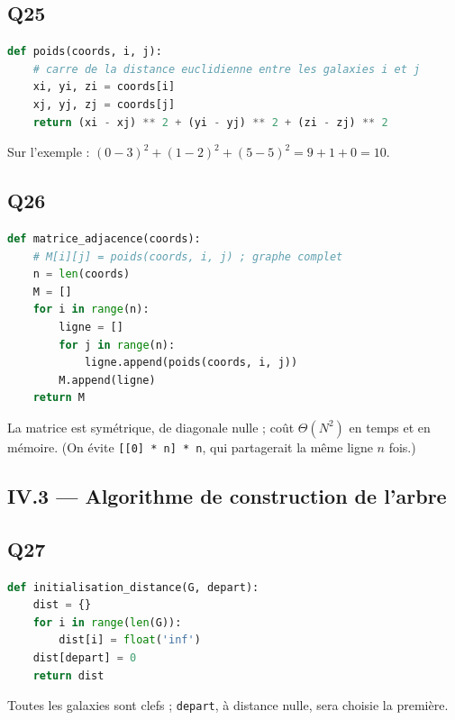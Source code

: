 \documentclass[11pt,a4paper]{article}
\begin{document}
\hypertarget{q25}{%
\subsection{Q25}\label{q25}}

\begin{lstlisting}[language=Python]
def poids(coords, i, j):
    # carre de la distance euclidienne entre les galaxies i et j
    xi, yi, zi = coords[i]
    xj, yj, zj = coords[j]
    return (xi - xj) ** 2 + (yi - yj) ** 2 + (zi - zj) ** 2
\end{lstlisting}

Sur l'exemple : \((0-3)^2 + (1-2)^2 + (5-5)^2 = 9 + 1 + 0 = 10\).

\hypertarget{q26}{%
\subsection{Q26}\label{q26}}

\begin{lstlisting}[language=Python]
def matrice_adjacence(coords):
    # M[i][j] = poids(coords, i, j) ; graphe complet
    n = len(coords)
    M = []
    for i in range(n):
        ligne = []
        for j in range(n):
            ligne.append(poids(coords, i, j))
        M.append(ligne)
    return M
\end{lstlisting}

La matrice est symétrique, de diagonale nulle ; coût \(\Theta(N^2)\) en temps et en mémoire. (On évite \texttt{{[}{[}0{]}\ *\ n{]}\ *\ n}, qui partagerait la même ligne \(n\) fois.)

\hypertarget{iv.3-algorithme-de-construction-de-larbre}{%
\subsection{IV.3 --- Algorithme de construction de l'arbre}\label{iv.3-algorithme-de-construction-de-larbre}}

\hypertarget{q27}{%
\subsection{Q27}\label{q27}}

\begin{lstlisting}[language=Python]
def initialisation_distance(G, depart):
    dist = {}
    for i in range(len(G)):
        dist[i] = float('inf')
    dist[depart] = 0
    return dist
\end{lstlisting}

Toutes les galaxies sont clefs ; \texttt{depart}, à distance nulle, sera choisie la première.
\end{document}
